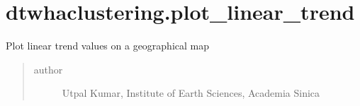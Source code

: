 \documentclass[letterpaper,10pt,english]{sphinxmanual}
\begin{document}
\chapter{dtwhaclustering.plot\_linear\_trend}
\label{\detokenize{modules/plot_linear_trend:module-dtwhaclustering.plot_linear_trend}}\label{\detokenize{modules/plot_linear_trend:dtwhaclustering-plot-linear-trend}}\label{\detokenize{modules/plot_linear_trend::doc}}
\sphinxAtStartPar
Plot linear trend values on a geographical map
\begin{quote}\begin{description}
\item[{author}] \leavevmode
\sphinxAtStartPar
Utpal Kumar, Institute of Earth Sciences, Academia Sinica

\end{description}\end{quote}
\end{document}
